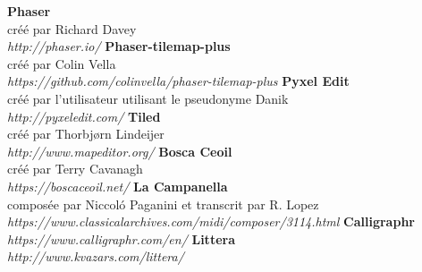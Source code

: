 \documentclass[11pt]{article}
\begin{document}
\newpage
{}
\begin{thebibliography}{9}
\textbf{Phaser}\\
créé par Richard Davey\\
\textit{http://phaser.io/}
\bibitem{}
\textbf{Phaser-tilemap-plus}\\
créé par Colin Vella\\
\textit{https://github.com/colinvella/phaser-tilemap-plus}
\bibitem{}
\textbf{Pyxel Edit}\\
créé par l'utilisateur utilisant le pseudonyme Danik\\
\textit{http://pyxeledit.com/}
\bibitem{}
\textbf{Tiled}\\
créé par Thorbjørn Lindeijer\\
\textit{http://www.mapeditor.org/}
\bibitem{}
\textbf{Bosca Ceoil}\\
créé par Terry Cavanagh\\
\textit{https://boscaceoil.net/}
\bibitem{}
\textbf{La Campanella}\\
composée par Niccoló Paganini et transcrit par R. Lopez\\
\textit{https://www.classicalarchives.com/midi/composer/3114.html}
\bibitem{}
\textbf{Calligraphr}\\
\textit{https://www.calligraphr.com/en/}
\bibitem{}
\textbf{Littera}\\
\textit{http://www.kvazars.com/littera/}
\end{thebibliography}
\end{document}
